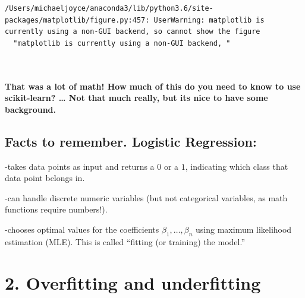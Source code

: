 \documentclass[11pt]{article}
\begin{document}
    \begin{Verbatim}[commandchars=\\\{\}]
/Users/michaeljoyce/anaconda3/lib/python3.6/site-packages/matplotlib/figure.py:457: UserWarning: matplotlib is currently using a non-GUI backend, so cannot show the figure
  "matplotlib is currently using a non-GUI backend, "

    \end{Verbatim}

    \begin{center}
    \end{center}
    { \hspace*{\fill} \\}
    
    \hypertarget{that-was-a-lot-of-math-how-much-of-this-do-you-need-to-know-to-use-scikit-learn-not-that-much-really-but-its-nice-to-have-some-background.}{%
\paragraph{That was a lot of math! How much of this do you need to know
to use scikit-learn? \ldots{} Not that much really, but its nice to have
some
background.}\label{that-was-a-lot-of-math-how-much-of-this-do-you-need-to-know-to-use-scikit-learn-not-that-much-really-but-its-nice-to-have-some-background.}}

    \hypertarget{facts-to-remember.-logistic-regression}{%
\subsection{Facts to remember. Logistic
Regression:}\label{facts-to-remember.-logistic-regression}}

-takes data points as input and returns a \(0\) or a \(1\), indicating
which class that data point belongs in.

-can handle discrete numeric variables (but not categorical variables,
as math functions require numbers!).

-chooses optimal values for the coefficients
\(\beta_{1},\dots, \beta_{n}\) using maximum likelihood estimation
(MLE). This is called ``fitting (or training) the model.''

    \hypertarget{overfitting-and-underfitting}{%
\section{2. Overfitting and
underfitting}\label{overfitting-and-underfitting}}
\end{document}
